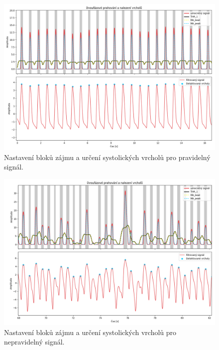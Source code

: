 \begin{figure}[t]
	\vspace{-9mm}
	\centering
	\includegraphics[width=1\textwidth]{./obrazky/Elgendi_THR_Peaks_Clean.png}
	\vspace{-10mm}
	\caption[Elgendiho zpracování pravidelného signálu]{Nastavení bloků zájmu a určení systolických vrcholů pro pravidelný signál.}
	\label{fig:thresholds_peaks_clean}
\end{figure}

\begin{figure}[b]
	\centering
	\vspace{-10mm}
	\includegraphics[width=1\textwidth]{./obrazky/Elgendi_THR_Peaks.png}
	\caption[Elgendiho zpracování nepravidelného signálu]{Nastavení bloků zájmu a určení systolických vrcholů pro nepravidelný signál.}
	\vspace{-15mm}
	\label{fig:thresholds_peaks}
\end{figure}